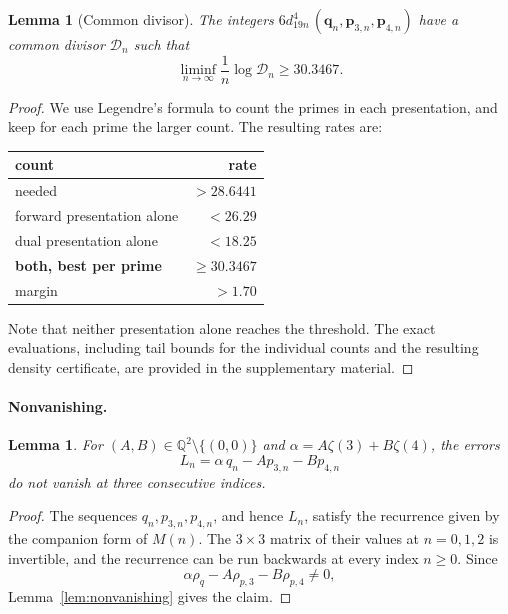 \documentclass[oneside,english,11pt]{amsart}
\newtheorem{lemma}[thm]{Lemma}
\begin{document}
\begin{lemma}[Common divisor]\label{prop:z34-divisor}
The integers $6d_{19n}^{4}\,(\mathbf q_n,\mathbf p_{3,n},\mathbf p_{4,n})$ have a common divisor $\mathcal D_n$ such that
\[
\liminf_{n\to\infty}\frac1n\log\mathcal D_n\ge30.3467.
\]

\end{lemma}

\begin{proof}
We use Legendre's formula to count the primes in each presentation, and keep for each prime the larger count. The resulting rates are:
\begin{center}
\renewcommand{\arraystretch}{1.25}
\small
\begin{tabular}{lr}
\toprule
count & rate\\
\midrule
needed  & $>28.6441$\\
\midrule
forward presentation alone & $<26.29$\\
dual presentation alone & $<18.25$\\
\midrule
\textbf{both, best per prime} & $\boldsymbol{\ge30.3467}$\\
margin & $>1.70$\\
\bottomrule
\end{tabular}
\end{center}
Note that neither presentation alone reaches the threshold.
The exact evaluations, including tail bounds for the individual counts and the resulting density certificate, are provided in the supplementary material.
\end{proof}

\paragraph{Nonvanishing.}

\begin{lemma}\label{lem:z34-nonvanishing}
For $(A,B)\in\mathbb Q^2\setminus\{(0,0)\}$ and $\alpha=A\zeta(3)+B\zeta(4)$, the errors
\[
  L_n=\alpha\,q_n-Ap_{3,n}-Bp_{4,n}
\]
do not vanish at three consecutive indices.
\end{lemma}

\begin{proof}
The sequences $q_n,p_{3,n},p_{4,n}$, and hence $L_n$, satisfy the recurrence given by the companion form of $M(n)$. The $3\times3$ matrix of their values at $n=0,1,2$ is invertible, and the recurrence can be run backwards at every index $n\ge0$. Since
\[
\alpha\rho_q-A\rho_{p,3}-B\rho_{p,4}\ne0,
\] Lemma~\ref{lem:nonvanishing} gives the claim.
\end{proof}
\end{document}
